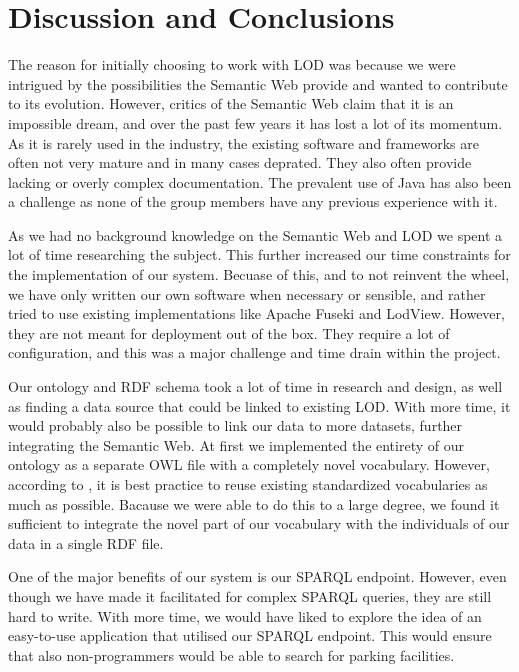 \chapter{Discussion and Conclusions}

The reason for initially choosing to work with LOD was because we were intrigued by the possibilities the Semantic Web provide and wanted to contribute to its evolution. However, critics of the Semantic Web claim that it is an impossible dream, and over the past few years it has lost a lot of its momentum. As it is rarely used in the industry, the existing software and frameworks are often not very mature and in many cases deprated. They also often provide lacking or overly complex documentation. The prevalent use of Java has also been a challenge as none of the group members have any previous experience with it. 

\vspace{5mm}

As we had no background knowledge on the Semantic Web and LOD we spent a lot of time researching the subject. This further increased our time constraints for the implementation of our system. Becuase of this, and to not reinvent the wheel, we have only written our own software when necessary or sensible, and rather tried to use existing implementations like Apache Fuseki and LodView. However, they are not meant for deployment out of the box. They require a lot of configuration, and this was a major challenge and time drain within the project.

\vspace{5mm}

Our ontology and RDF schema took a lot of time in research and design, as well as finding a data source that could be linked to existing LOD. With more time, it would probably also be possible to link our data to more datasets, further integrating the Semantic Web. At first we implemented the entirety of our ontology as a separate OWL file with a completely novel vocabulary. However, according to \cite{w3-best-practices}, it is best practice to reuse existing standardized vocabularies as much as possible. Bacause we were able to do this to a large degree, we found it sufficient to integrate the novel part of our vocabulary with the individuals of our data in a single RDF file.

\vspace{5mm}

One of the major benefits of our system is our SPARQL endpoint. However, even though we have made it facilitated for complex SPARQL queries, they are still hard to write. With more time, we would have liked to explore the idea of an easy-to-use application that utilised our SPARQL endpoint. This would ensure that also non-programmers would be able to search for parking facilities.

